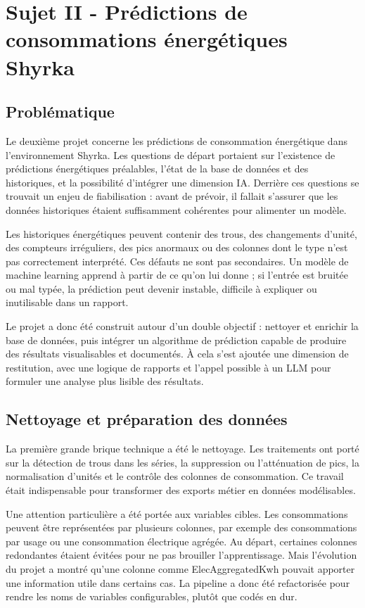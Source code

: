 \documentclass[12pt]{article}
\begin{document}
\newpage
\section{Sujet II - Prédictions de consommations énergétiques Shyrka}

\subsection{Problématique}

Le deuxième projet concerne les prédictions de consommation énergétique dans l’environnement Shyrka. Les questions de départ portaient sur l’exi\-stence de prédictions énergétiques préalables, l’état de la base de données et des historiques, et la possibilité d’intégrer une dimension IA. Derrière ces questions se trouvait un enjeu de fiabilisation : avant de prévoir, il fallait s’assurer que les données historiques étaient suffisamment cohérentes pour alimenter un modèle. 

Les historiques énergétiques peuvent contenir des trous, des changements d’unité, des compteurs irréguliers, des pics anormaux ou des colonnes dont le type n’est pas correctement interprété. Ces défauts ne sont pas secondaires. Un modèle de machine learning apprend à partir de ce qu’on lui donne ; si l’entrée est bruitée ou mal typée, la prédiction peut devenir instable, difficile à expliquer ou inutilisable dans un rapport. 

Le projet a donc été construit autour d’un double objectif : nettoyer et enrichir la base de données, puis intégrer un algorithme de prédiction capable de produire des résultats visualisables et documentés. À cela s’est ajoutée une dimension de restitution, avec une logique de rapports et l’appel possible à un LLM pour formuler une analyse plus lisible des résultats. 

\subsection{Nettoyage et préparation des données}

La première grande brique technique a été le nettoyage. Les traitements ont porté sur la détection de trous dans les séries, la suppression ou l’atténuation de pics, la normalisation d’unités et le contrôle des colonnes de consommation. Ce travail était indispensable pour transformer des exports métier en données modélisables. 

Une attention particulière a été portée aux variables cibles. Les consommations peuvent être représentées par plusieurs colonnes, par exemple des consommations par usage ou une consommation électrique agrégée. Au départ, certaines colonnes redondantes étaient évitées pour ne pas brouiller l’apprentissage. Mais l’évolution du projet a montré qu’une colonne comme ElecAggregatedKwh pouvait apporter une information utile dans certains cas. La pipeline a donc été refactorisée pour rendre les noms de variables configurables, plutôt que codés en dur. 
\end{document}
